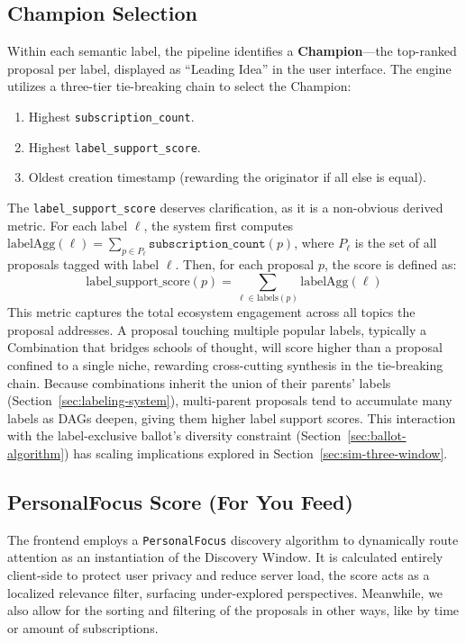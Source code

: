 \documentclass[a4paper, 12pt, twoside]{iviathesis}
\begin{document}
\subsection{Champion Selection}
\label{sec:champion-selection}

Within each semantic label, the pipeline identifies a \textbf{Champion}---the top-ranked proposal per label, displayed as ``Leading Idea'' in the user interface. The engine utilizes a three-tier tie-breaking chain to select the Champion:
\begin{enumerate}
    \item Highest \texttt{subscription\_count}.
    \item Highest \texttt{label\_support\_score}.
    \item Oldest creation timestamp (rewarding the originator if all else is equal).
\end{enumerate}

The \texttt{label\_support\_score} deserves clarification, as it is a non-obvious derived metric. For each label $\ell$, the system first computes $\text{labelAgg}(\ell) = \sum_{p \in P_\ell} \texttt{subscription\_count}(p)$, where $P_\ell$ is the set of all proposals tagged with label $\ell$. Then, for each proposal $p$, the score is defined as:
\begin{equation}
\text{label\_support\_score}(p) = \sum_{\ell \in \text{labels}(p)} \text{labelAgg}(\ell)
\end{equation}
This metric captures the total ecosystem engagement across all topics the proposal addresses. A proposal touching multiple popular labels, typically a Combination that bridges schools of thought, will score higher than a proposal confined to a single niche, rewarding cross-cutting synthesis in the tie-breaking chain. Because combinations inherit the union of their parents' labels (Section~\ref{sec:labeling-system}), multi-parent proposals tend to accumulate many labels as DAGs deepen, giving them higher label support scores. This interaction with the label-exclusive ballot's diversity constraint (Section~\ref{sec:ballot-algorithm}) has scaling implications explored in Section~\ref{sec:sim-three-window}.

\subsection{PersonalFocus Score (For You Feed)}
\label{sec:personalfocus}
The frontend employs a \texttt{PersonalFocus} discovery algorithm to dynamically route attention as an instantiation of the Discovery Window. It is calculated entirely client-side to protect user privacy and reduce server load, the score acts as a localized relevance filter, surfacing under-explored perspectives. Meanwhile, we also allow for the sorting and filtering of the proposals in other ways, like by time or amount of subscriptions.
\end{document}
